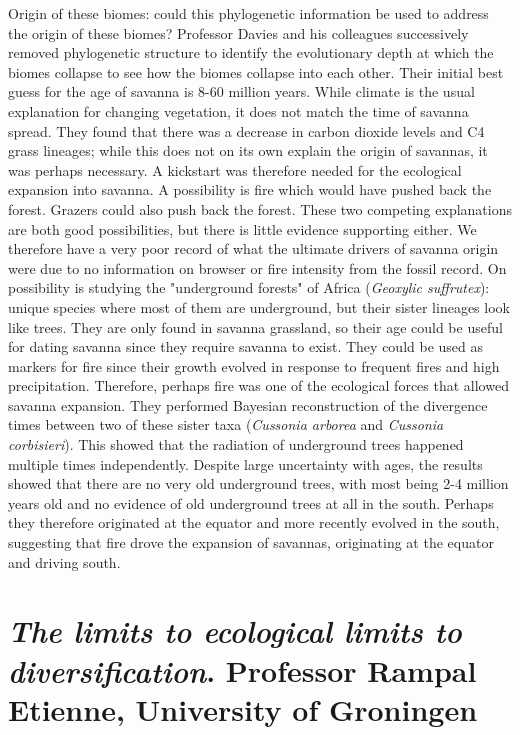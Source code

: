 \documentclass[9pt]{article}
\begin{document}
	Origin of these biomes: could this phylogenetic information be used to address the origin of these biomes? Professor Davies and his colleagues successively removed phylogenetic structure to identify the evolutionary depth at which the biomes collapse to see how the biomes collapse into each other. Their initial best guess for the age of savanna is 8-60 million years. While climate is the usual explanation for changing vegetation, it does not match the time of savanna spread. They found that there was a decrease in carbon dioxide levels and C4 grass lineages; while this does not on its own explain the origin of savannas, it was perhaps necessary. A kickstart was therefore needed for the ecological expansion into savanna. A possibility is fire which would have pushed back the forest. Grazers could also push back the forest. These two competing explanations are both good possibilities, but there is little evidence supporting either. We therefore have a very poor record of what the ultimate drivers of savanna origin were due to no information on browser or fire intensity from the fossil record. On possibility is studying the "underground forests" of Africa (\textit{Geoxylic suffrutex}): unique species where most of them are underground, but their sister lineages look like trees. They are only found in savanna grassland, so their age could be useful for dating savanna since they require savanna to exist. They could be used as markers for fire since their growth evolved in response to frequent fires and high precipitation. Therefore, perhaps fire was one of the ecological forces that allowed savanna expansion. They performed Bayesian reconstruction of the divergence times between two of these sister taxa (\textit{Cussonia arborea} and \textit{Cussonia corbisieri}). This showed that the radiation of underground trees happened multiple times independently. Despite large uncertainty with ages, the results showed that there are no very old underground trees, with most being 2-4 million years old and no evidence of old underground trees at all in the south. Perhaps they therefore originated at the equator and more recently evolved in the south, suggesting that fire drove the expansion of savannas, originating at the equator and driving south. 

	
	
	\section{\textit{The limits to ecological limits to diversification}. Professor Rampal Etienne, University of Groningen}
	
\end{document}
